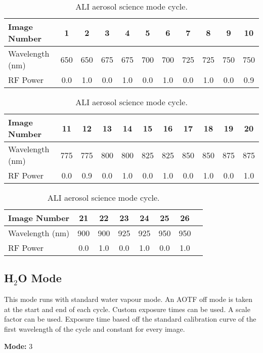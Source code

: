 \begin{table}
    \begin{center}
    \begin{tabular}{|l|c|c|c|c|c|c|c|c|c|c|}
    \hline
    Image Number & 1 & 2 & 3 & 4 & 5 & 6 & 7 & 8 & 9 & 10 \\
    \hline
    Wavelength (nm) & 650 & 650 & 675 & 675 & 700 & 700 & 725 & 725 & 750 & 750 \\
    \hline
    RF Power & 0.0 & 1.0 & 0.0 & 1.0 & 0.0 & 1.0 & 0.0 & 1.0 & 0.0 & 0.9 \\
    \hline
    \end{tabular}
    \vspace{5mm}
    \begin{tabular}{|l|c|c|c|c|c|c|c|c|c|c|}
    \hline
    Image Number & 11 & 12 & 13 & 14 & 15 & 16 & 17 & 18 & 19 & 20 \\
    \hline
    Wavelength (nm) & 775 & 775 & 800 & 800 & 825 & 825 & 850 & 850 & 875 & 875 \\
    \hline
    RF Power & 0.0 & 0.9 & 0.0 & 1.0 & 0.0 & 1.0 & 0.0 & 1.0 & 0.0 & 1.0 \\
    \hline
    \end{tabular}
    \vspace{5mm}
    \begin{tabular}{|l|c|c|c|c|c|c|c|}
    \hline
    Image Number & 21 & 22 & 23 & 24 & 25 & 26 \\
    \hline
    Wavelength (nm) & 900 & 900 & 925 & 925 & 950 & 950 \\
    \hline
    RF Power & 0.0 & 1.0 & 0.0 & 1.0 & 0.0 & 1.0\\
    \hline
    \end{tabular}
    \end{center}
    \caption[ALI Aerosol Science Mode Cycle]{ALI aerosol science mode cycle.}
    \label{tab:B.2:AerosolScienceModes}
\end{table}

\subsection{H$_{2}$O Mode}

This mode runs with standard water vapour mode. An AOTF off mode is taken at the start and end of each cycle. Custom exposure times can be used. A scale factor can be used. Exposure time based off the standard calibration curve of the first wavelength of the cycle and constant for every image.

\textbf{Mode:} 3

